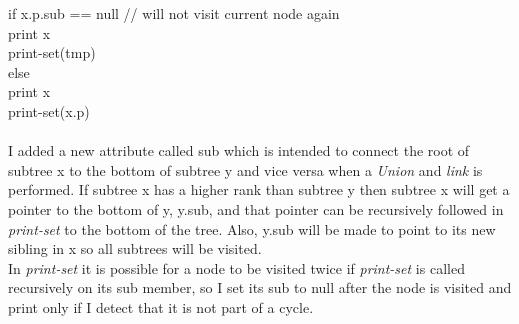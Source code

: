 \documentclass{article}
\begin{document}
\-\hspace{1cm}if x.p.sub == null // will not visit current node again\\
\-\hspace{1.5cm}print x\\
\-\hspace{1cm}print-set(tmp)\\
\-\hspace{.5cm}else\\
\-\hspace{1cm}print x\\
\-\hspace{1cm}print-set(x.p)\\\\
I added a new attribute called sub which is intended to connect the root of subtree x to the bottom of subtree y and vice versa when a \textit{Union} and \textit{link} is performed. If subtree x has a higher rank than subtree y then subtree x will get a pointer to the bottom of y, y.sub, and that pointer can be recursively followed in \textit{print-set} to the bottom of the tree.  Also, y.sub will be made to point to its new sibling in x so all subtrees will be visited.\\
In \textit{print-set} it is possible for a node to be visited twice if \textit{print-set} is called recursively on its sub member, so I set its sub to null after the node is visited and print only if I detect that it is not part of a cycle.
\end{document}
